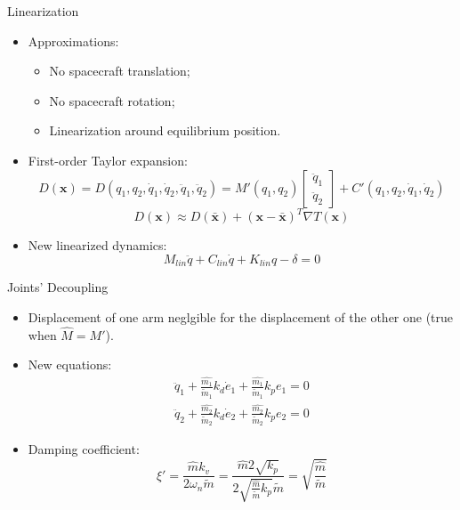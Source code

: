 \begin{frame}{Linearization}
  \begin{itemize}
    \item Approximations:
    \begin{itemize}
      \item No spacecraft translation;
      \item No spacecraft rotation;
      \item Linearization around equilibrium position.
    \end{itemize}
    \item First-order Taylor expansion:
    \begin{equation}
      D(\textbf{x})=D(q_1,q_2,\dot{q}_1,\dot{q}_2,\ddot{q}_1,\ddot{q}_2)=M'(q_1,q_2)\begin{bmatrix}
        \ddot{q}_1\\
        \ddot{q}_2
      \end{bmatrix}+C'(q_1,q_2,\dot{q}_1,\dot{q}_2)
    \end{equation}
    \begin{equation}
      D(\textbf{x})\approx D(\bar{\textbf{x}})+(\textbf{x}-\bar{\textbf{x}})^T\nabla T(\textbf{x})
    \end{equation}
    \item New linearized dynamics:
    \begin{equation}
      M_{lin}\ddot{q}+C_{lin}\dot{q}+K_{lin}q-\delta=0
    \end{equation}
  \end{itemize}
\end{frame}

\begin{frame}{Joints' Decoupling}
  \begin{itemize}
    \item Displacement of one arm neglgible for the displacement of the other one (true when $\hat{M}=M'$).
    \item New equations:
    \begin{equation}
      \begin{array}{l}
        \ddot{q}_1+\frac{\hat{m_1}}{\tilde{m}_1}k_d\dot{e}_1+\frac{\hat{m_1}}{\tilde{m}_1}k_p e_1=0\\
        \ddot{q}_2+\frac{\hat{m_2}}{\tilde{m}_2}k_d\dot{e}_2+\frac{\hat{m_2}}{\tilde{m}_2}k_p e_2=0
      \end{array}
    \end{equation}
    \item Damping coefficient:
    \begin{equation}
      \xi'=\frac{\hat{m}k_v}{2\omega_n \tilde{m}}=\frac{\hat{m}2\sqrt{k_p}}{2\sqrt{\frac{\hat{m}}{\tilde{m}}k_p} \tilde{m}}=\sqrt{\frac{\hat{m}}{\tilde{m}}}
      \label{mass_relation}
    \end{equation}
  \end{itemize}
\end{frame}

